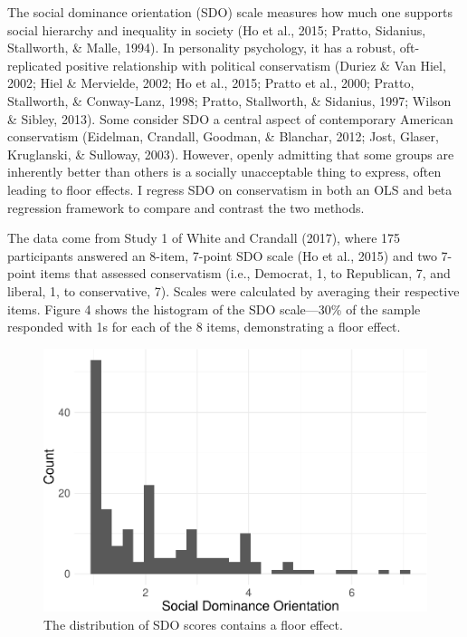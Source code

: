 \documentclass[english,man]{apa6}
\theoremstyle{definition}
\theoremstyle{definition}
\theoremstyle{remark}
\begin{document}
The social dominance orientation (SDO) scale measures how much one
supports social hierarchy and inequality in society (Ho et al., 2015;
Pratto, Sidanius, Stallworth, \& Malle, 1994). In personality
psychology, it has a robust, oft-replicated positive relationship with
political conservatism (Duriez \& Van Hiel, 2002; Hiel \& Mervielde,
2002; Ho et al., 2015; Pratto et al., 2000; Pratto, Stallworth, \&
Conway-Lanz, 1998; Pratto, Stallworth, \& Sidanius, 1997; Wilson \&
Sibley, 2013). Some consider SDO a central aspect of contemporary
American conservatism (Eidelman, Crandall, Goodman, \& Blanchar, 2012;
Jost, Glaser, Kruglanski, \& Sulloway, 2003). However, openly admitting
that some groups are inherently better than others is a socially
unacceptable thing to express, often leading to floor effects. I regress
SDO on conservatism in both an OLS and beta regression framework to
compare and contrast the two methods.

The data come from Study 1 of White and Crandall (2017), where 175
participants answered an 8-item, 7-point SDO scale (Ho et al., 2015) and
two 7-point items that assessed conservatism (i.e., Democrat, 1, to
Republican, 7, and liberal, 1, to conservative, 7). Scales were
calculated by averaging their respective items. Figure 4 shows the
histogram of the SDO scale---30\% of the sample responded with 1s for
each of the 8 items, demonstrating a floor effect.

\begin{figure}
\centering
\includegraphics{beta_hurdle_files/figure-latex/unnamed-chunk-11-1.pdf}
\caption{\label{fig:unnamed-chunk-11}The distribution of SDO scores contains
a floor effect.}
\end{figure}
\end{document}
